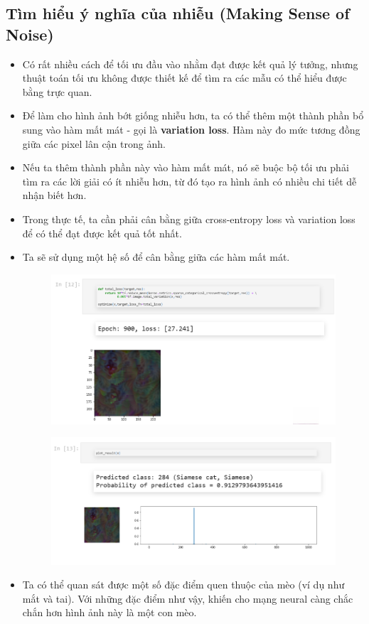 \documentclass{book}
\begin{document}
\subsection{Tìm hiểu ý nghĩa của nhiễu (Making Sense of Noise)}
\begin{itemize}
	\item Có rất nhiều cách để tối ưu đầu vào nhằm đạt được kết quả lý tưởng, nhưng thuật toán tối ưu không được thiết kế để tìm ra các mẫu có thể hiểu được bằng trực quan.
	\item Để làm cho hình ảnh bớt giống nhiễu hơn, ta có thể thêm một thành phần bổ sung vào hàm mất mát - gọi là \textbf{variation loss}. Hàm này đo mức tương đồng giữa các pixel lân cận trong ảnh.
	\item Nếu ta thêm thành phần này vào hàm mất mát, nó sẽ buộc bộ tối ưu phải tìm ra các lời giải có ít nhiễu hơn, từ đó tạo ra hình ảnh có nhiều chi tiết dễ nhận biết hơn.
	\item Trong thực tế, ta cần phải cân bằng giữa cross-entropy loss và variation loss để có thể đạt được kết quả tốt nhất.
	\item Ta sẽ sử dụng một hệ số để cân bằng giữa các hàm mất mát.
	\begin{figure}[H]
		\centering
		\includegraphics[width=0.75\linewidth]{images/ad6_variloss.png}
	\end{figure}
	\begin{figure}[H]
		\centering
		\includegraphics[width=0.75\linewidth]{images/ad7_predict.png}
	\end{figure}
	\item Ta có thể quan sát được một số đặc điểm quen thuộc của mèo (ví dụ như mắt và tai). Với những đặc điểm như vậy, khiến cho mạng neural càng chắc chắn hơn hình ảnh này là một con mèo.

\end{itemize}
\end{document}
